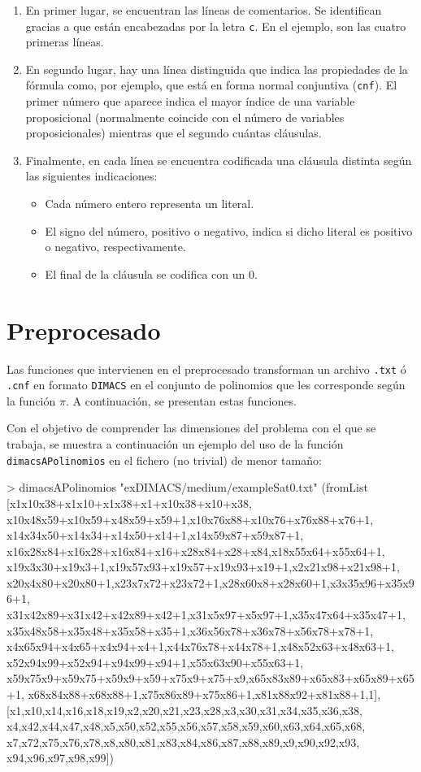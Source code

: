 \begin{enumerate}
\item En primer lugar, se encuentran las líneas de comentarios. Se identifican gracias a que están encabezadas por la letra \texttt{c}. En el ejemplo, son las cuatro primeras líneas.
\item En segundo lugar, hay una línea distinguida que indica las propiedades de la fórmula como, por ejemplo, que está en forma normal conjuntiva (\texttt{cnf}). El primer número que aparece indica el mayor índice de una variable proposicional (normalmente coincide con el número de variables proposicionales) mientras que el segundo cuántas cláusulas. 
\item Finalmente, en cada línea se encuentra codificada una cláusula distinta según las siguientes indicaciones:
\begin{itemize}
\item Cada número entero representa un literal.
\item El signo del número, positivo o negativo, indica si dicho literal es positivo o negativo, respectivamente.
\item El final de la cláusula se codifica con un 0.
\end{itemize} 
\end{enumerate}

\newpage
\section{Preprocesado}

Las funciones que intervienen en el preprocesado transforman un archivo \texttt{.txt} ó \texttt{.cnf} en formato \texttt{DIMACS} en el conjunto de polinomios que les corresponde según la función $\pi$. A continuación, se presentan estas funciones.


Con el objetivo de comprender las dimensiones del problema con el que se trabaja, se muestra a continuación un ejemplo del uso de la función \texttt{dimacsAPolinomios} en el fichero (no trivial) de menor tamaño:

\begin{code}
> dimacsAPolinomios "exDIMACS/medium/exampleSat0.txt"
(fromList [x1x10x38+x1x10+x1x38+x1+x10x38+x10+x38,
x10x48x59+x10x59+x48x59+x59+1,x10x76x88+x10x76+x76x88+x76+1,
x14x34x50+x14x34+x14x50+x14+1,x14x59x87+x59x87+1,
x16x28x84+x16x28+x16x84+x16+x28x84+x28+x84,x18x55x64+x55x64+1,
x19x3x30+x19x3+1,x19x57x93+x19x57+x19x93+x19+1,x2x21x98+x21x98+1,
x20x4x80+x20x80+1,x23x7x72+x23x72+1,x28x60x8+x28x60+1,x3x35x96+x35x96+1,
x31x42x89+x31x42+x42x89+x42+1,x31x5x97+x5x97+1,x35x47x64+x35x47+1,
x35x48x58+x35x48+x35x58+x35+1,x36x56x78+x36x78+x56x78+x78+1,
x4x65x94+x4x65+x4x94+x4+1,x44x76x78+x44x78+1,x48x52x63+x48x63+1,
x52x94x99+x52x94+x94x99+x94+1,x55x63x90+x55x63+1,
x59x75x9+x59x75+x59x9+x59+x75x9+x75+x9,x65x83x89+x65x83+x65x89+x65+1,
x68x84x88+x68x88+1,x75x86x89+x75x86+1,x81x88x92+x81x88+1,1],
[x1,x10,x14,x16,x18,x19,x2,x20,x21,x23,x28,x3,x30,x31,x34,x35,x36,x38,
x4,x42,x44,x47,x48,x5,x50,x52,x55,x56,x57,x58,x59,x60,x63,x64,x65,x68,
x7,x72,x75,x76,x78,x8,x80,x81,x83,x84,x86,x87,x88,x89,x9,x90,x92,x93,
x94,x96,x97,x98,x99])
\end{code}

